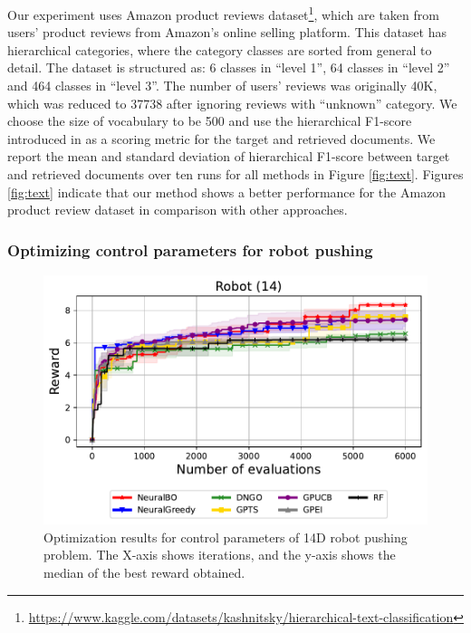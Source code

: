 Our experiment uses Amazon product reviews 
dataset\footnote{\url{https://www.kaggle.com/datasets/kashnitsky/hierarchical-text-classification}}, which are taken from users' product reviews from Amazon's online selling platform. This dataset has hierarchical categories, where the category classes are sorted from general to detail. The dataset is structured as: 6 classes in ``level 1'', 64 classes in ``level 2'' and 464 classes in ``level 3''. The number of users' reviews was originally 40K, which was reduced to 37738 after ignoring reviews with ``unknown'' category. We choose the size of vocabulary to be 500 and use the hierarchical F1-score introduced in  \citet{kiritchenko2005functional} as a scoring metric for the target and retrieved documents. We report the mean and standard deviation of hierarchical F1-score between target and retrieved documents over ten runs for all methods in Figure \ref{fig:text}. Figures \ref{fig:text} indicate that our method shows a better performance for the Amazon product review dataset in comparison with other approaches. 

\subsubsection{Optimizing control parameters for robot pushing} 
\begin{figure}[H]
    \centering
    \includegraphics[width=\textwidth]{Figures/Neural-BO/Neural-BO_Robot_dim_14_round_6000.pdf}
    \vspace{-3mm}
    \caption{
    Optimization results for control parameters of 14D robot pushing problem. The X-axis shows iterations, and the y-axis shows the median of the best reward obtained.}
    \label{fig:robot_14D}
\end{figure}

